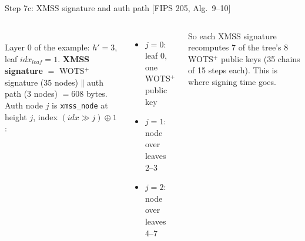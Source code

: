 \documentclass[aspectratio=169,11pt]{beamer}
\newcommand{\cat}{\mathbin{\Vert}}
\newcommand{\sg}[1]{\textcolor{sig}{#1}}
\newcommand{\alg}[1]{\textcolor{quiet}{\footnotesize[FIPS 205, Alg.~#1]}}
\begin{document}
\begin{frame}{Step 7c: XMSS signature and auth path \alg{9--10}}
  \begin{columns}[c]
    \centering
    \\
    \footnotesize\textcolor{quiet}{Layer 0 of the example: $h'=3$, leaf $\mathit{idx}_{\mathit{leaf}}=1$.}
    \small
    \textbf{XMSS signature} $=$ \sg{WOTS$^+$ signature} (35 nodes) $\cat$ \textcolor{accent}{auth path} (3 nodes) $= 608$ bytes.\\[2mm]
    Auth node $j$ is \texttt{xmss\_node} at height $j$, index $(\mathit{idx}\gg j)\oplus 1$:
    \begin{itemize}
      \item $j=0$: leaf 0, one WOTS$^+$ public key
      \item $j=1$: node over leaves 2--3
      \item $j=2$: node over leaves 4--7
    \end{itemize}
    So each XMSS signature recomputes 7 of the tree's 8 WOTS$^+$ public keys (35 chains of 15 steps each).
    This is where signing time goes.
  \end{columns}
\end{frame}
\end{document}
